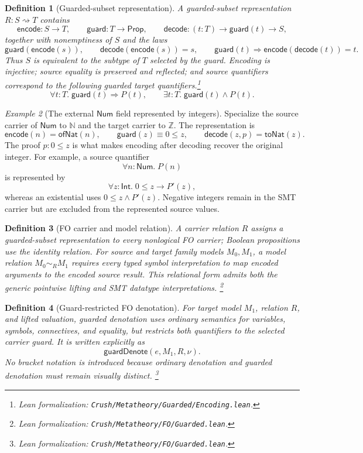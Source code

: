 \documentclass[11pt]{article}
\newtheorem{definition}{Definition}[section]
\theoremstyle{remark}
\newtheorem{example}[definition]{Example}
\newcommand{\leanfile}[1]{\footnote{Lean formalization: \texttt{Crush/Metatheory/#1}.}}
\newcommand{\Num}{\mathsf{Num}}
\begin{document}
\begin{definition}[Guarded-subset representation]
A guarded-subset representation $R:S\rightsquigarrow T$ contains
\[
 \mathsf{encode}:S\to T,\qquad
 \mathsf{guard}:T\to\mathsf{Prop},\qquad
 \mathsf{decode}:(t:T)\to\mathsf{guard}(t)\to S,
\]
together with nonemptiness of $S$ and the laws
\[
 \mathsf{guard}(\mathsf{encode}(s)),\qquad
 \mathsf{decode}(\mathsf{encode}(s))=s,\qquad
 \mathsf{guard}(t)\Rightarrow
   \mathsf{encode}(\mathsf{decode}(t))=t.
\]
Thus $S$ is equivalent to the subtype of $T$ selected by the guard. Encoding is injective;
source equality is preserved and reflected; and source quantifiers correspond
to the following guarded target quantifiers.\leanfile{Guarded/Encoding.lean}
\[
 \forall t:T.\;\mathsf{guard}(t)\Rightarrow P(t),
 \qquad
 \exists t:T.\;\mathsf{guard}(t)\land P(t).
\]
\end{definition}

\begin{example}[The external $\Num$ field represented by integers]
Specialize the source carrier of $\Num$ to $\mathbb N$ and the target carrier
to $\mathbb Z$. The representation is
\[
 \mathsf{encode}(n)=\mathsf{ofNat}(n),
 \qquad
 \mathsf{guard}(z)\equiv 0\le z,
 \qquad
 \mathsf{decode}(z,p)=\mathsf{toNat}(z).
\]
The proof $p:0\le z$ is what makes encoding after decoding recover the original
integer. For example, a source quantifier
\[
 \forall n{:}\Num.\;P(n)
\]
is represented by
\[
 \forall z{:}\mathsf{Int}.\;0\le z\to P'(z),
\]
whereas an existential uses $0\le z\land P'(z)$. Negative integers remain in
the SMT carrier but are excluded from the represented source values.
\end{example}

\begin{definition}[FO carrier and model relation]
A carrier relation $R$ assigns a guarded-subset representation to every nonlogical FO
carrier; Boolean propositions use the identity relation. For source and target
family models $M_0,M_1$, a model relation
$M_0\sim_R M_1$ requires every typed symbol interpretation to map encoded
arguments to the encoded source result. This relational form admits both the
generic pointwise lifting and SMT datatype interpretations.
\leanfile{FO/Guarded.lean}
\end{definition}

\begin{definition}[Guard-restricted FO denotation]
For target model $M_1$, relation $R$, and lifted valuation, guarded denotation
uses ordinary semantics for variables, symbols, connectives, and equality, but
restricts both quantifiers to the selected carrier guard. It is written
explicitly as
\[
 \mathsf{guardDenote}(e,M_1,R,\nu).
\]
No bracket notation is introduced because ordinary denotation and guarded
denotation must remain visually distinct.
\leanfile{FO/Guarded.lean}
\end{definition}
\end{document}
